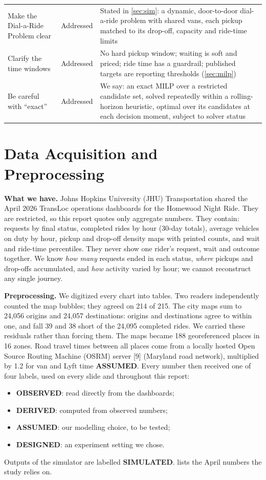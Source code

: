 \documentclass{article}
\newcommand{\lab}[1]{{\footnotesize\textsf{\textbf{#1}}}}
\newcommand{\OBS}{\lab{OBSERVED}}
\newcommand{\DER}{\lab{DERIVED}}
\newcommand{\ASM}{\lab{ASSUMED}}
\newcommand{\DES}{\lab{DESIGNED}}
\newcommand{\SIM}{\lab{SIMULATED}}
\begin{document}
\begin{table}[t]
\begin{tabularx}{\textwidth}{@{}P{4.4cm}P{1.9cm}L@{}}
Make the Dial-a-Ride Problem clear & Addressed & Stated in \cref{sec:sim}: a dynamic, door-to-door dial-a-ride problem with shared vans, each pickup matched to its drop-off, capacity and ride-time limits\\
Clarify the time windows & Addressed & No hard pickup window; waiting is soft and priced; ride time has a guardrail; published targets are reporting thresholds (\cref{sec:milp})\\
Be careful with ``exact'' & Addressed & We say: an exact MILP over a restricted candidate set, solved repeatedly within a rolling-horizon heuristic, optimal over its candidates at each decision moment, subject to solver status\\
\bottomrule
\end{tabularx}
\end{table}

\section{Data Acquisition and Preprocessing}\label{sec:data}

\textbf{What we have.} Johns Hopkins University (JHU) Transportation shared the April 2026 TransLoc operations dashboards for the Homewood Night Ride. They are restricted, so this report quotes only aggregate numbers. They contain: requests by final status, completed rides by hour (30-day totals), average vehicles on duty by hour, pickup and drop-off density maps with printed counts, and wait and ride-time percentiles. They never show one rider's request, wait and outcome together. We know \emph{how many} requests ended in each status, \emph{where} pickups and drop-offs accumulated, and \emph{how} activity varied by hour; we cannot reconstruct any single journey.

\textbf{Preprocessing.} We digitized every chart into tables. Two readers independently counted the map bubbles; they agreed on 214 of 215. The city maps sum to 24,056 origins and 24,057 destinations: origins and destinations agree to within one, and fall 39 and 38 short of the 24,095 completed rides. We carried these residuals rather than forcing them. The maps became 188 georeferenced places in 16 zones. Road travel times between all places come from a locally hosted Open Source Routing Machine (OSRM) server [9] (Maryland road network), multiplied by 1.2 for van and Lyft time \ASM. Every number then received one of four labels, used on every slide and throughout this report:
\begin{itemize}\setlength\itemsep{1pt}
\item \OBS: read directly from the dashboards;
\item \DER: computed from observed numbers;
\item \ASM: our modelling choice, to be tested;
\item \DES: an experiment setting we chose.
\end{itemize}
Outputs of the simulator are labelled \SIM.  lists the April numbers the study relies on.
\end{document}
